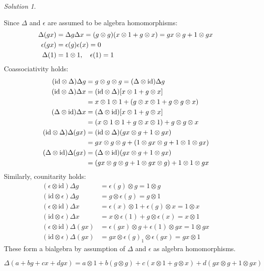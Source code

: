 \documentclass[svgnames]{article}
\theoremstyle{definition}
\theoremstyle{remark}
\newtheorem*{Solution*}{Solution}
\theoremstyle{underline}
\theoremstyle{underline}
\newcommand{\id}{\mathrm{id}}
\begin{document}
\begin{Solution*}
\begin{subquests}
			\item Since $\Delta$ and $\epsilon$ are assumed to be algebra homomorphisms:
			\begin{align*}
			\Delta(gx) & = \Delta g \Delta x = \pqty{g \otimes g}\pqty{x \otimes 1 + g \otimes x} = gx \otimes g + 1 \otimes gx \\
			\epsilon(gx) & = \epsilon(g) \epsilon(x) = 0\\
			\Delta(1) & = 1 \otimes 1, \quad \epsilon(1) = 1
			\end{align*}
			Coassociativity holds:
			\begin{align*}
			(\id \otimes \Delta) \Delta g & = g \otimes g \otimes g = (\Delta \otimes \id) \Delta g \\
			(\id \otimes \Delta) \Delta x & = (\id \otimes \Delta) \bqty{x \otimes 1 + g \otimes x} \\
			& = x \otimes 1 \otimes 1 + \pqty{g \otimes x \otimes 1 + g \otimes g \otimes x} \\
			(\Delta \otimes \id) \Delta x & = (\Delta \otimes \id)\bqty{x \otimes 1 + g \otimes x} \\
			& =  \pqty{x \otimes 1 \otimes 1 + g \otimes x \otimes 1} + g \otimes g \otimes x \\
			(\id \otimes \Delta)\Delta (gx) & = (\id \otimes \Delta)\pqty{gx \otimes g + 1 \otimes gx} \\
			& = gx \otimes g \otimes g + \pqty{1 \otimes gx \otimes g + 1 \otimes 1 \otimes gx} \\
			(\Delta \otimes \id)\Delta (gx) & = (\Delta \otimes \id)\pqty{gx \otimes g + 1 \otimes gx} \\
			& = \pqty{gx \otimes g \otimes g + 1 \otimes gx \otimes g} + 1 \otimes 1 \otimes gx
			\end{align*}
			Similarly, counitarity holds:
			\begin{align*}
			(\epsilon \otimes \id) \Delta g & = \epsilon (g) \otimes g = 1 \otimes g\\
			(\id \otimes \epsilon) \Delta g & = g \otimes \epsilon(g) = g \otimes 1\\
			(\epsilon \otimes \id) \Delta x & = \epsilon(x) \otimes 1 + \epsilon(g) \otimes x = 1 \otimes x\\
			(\id \otimes \epsilon) \Delta x & = x \otimes \epsilon(1) + g \otimes \epsilon(x) = x \otimes 1\\
			(\epsilon \otimes \id) \Delta(gx) & = \epsilon(gx) \otimes g + \epsilon(1) \otimes gx = 1 \otimes gx\\
			(\id \otimes \epsilon) \Delta(gx) & = gx \otimes \epsilon(g) _ 1 \otimes \epsilon(gx) = gx \otimes 1
			\end{align*}
			These form a bialgebra by assumption of $\Delta$ and $\epsilon$ as algebra homomorphisms.
			
			\item $\Delta(a + bg + cx + dgx) = a \otimes 1 + b(g \otimes g) + c(x \otimes 1 + g \otimes x) + d(gx \otimes g + 1 \otimes gx)$ 
		\end{subquests}
	\end{Solution*}
\end{document}
